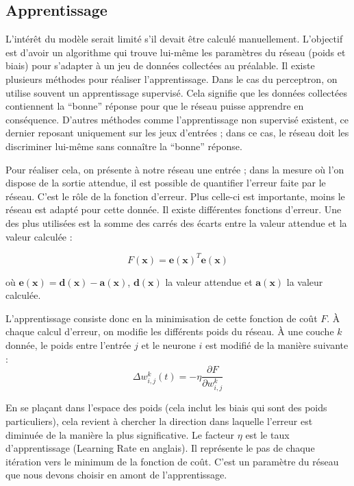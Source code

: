 \subsection{Apprentissage}

L'intérêt du modèle serait limité s'il devait être calculé manuellement. L'objectif est d'avoir un algorithme qui trouve lui-même les paramètres du réseau
(poids et biais) pour s'adapter à un jeu de données collectées au préalable. Il existe plusieurs méthodes pour réaliser l'apprentissage. Dans le cas du 
perceptron, on utilise souvent un apprentissage supervisé. Cela signifie que les données collectées contiennent la ``bonne'' réponse pour que 
le réseau puisse apprendre en conséquence. D'autres méthodes comme l'apprentissage non supervisé existent, ce dernier reposant uniquement sur les jeux 
d'entrées ; dans ce cas, le réseau doit les discriminer lui-même sans connaître la ``bonne'' réponse.

Pour réaliser cela, on présente à notre réseau une entrée ; dans la mesure où l'on dispose de la sortie attendue, il est possible de quantifier l'erreur
faite par le réseau.
C'est le rôle de la fonction d'erreur. Plus celle-ci est importante, moins le réseau est adapté pour cette donnée. Il existe différentes fonctions
d'erreur. Une des plus utilisées est la somme des carrés des écarts entre la valeur attendue et la valeur calculée : 

\begin{equation}
\displaystyle F\left(\mathbf{x}\right) = \mathbf{e\left(x\right)}^T\mathbf{e\left(x\right)} 
\end{equation}

où $\displaystyle \mathbf{e\left(x\right)} = \mathbf{d\left(x\right)} - \mathbf{a\left(x\right)} $,
$\mathbf{d\left(x\right)}$ la valeur attendue et $\mathbf{a\left(x\right)}$ la valeur calculée.


L'apprentissage consiste donc en la minimisation de cette fonction de coût $F$. À chaque calcul d'erreur, on modifie les différents poids du réseau.
À une couche $k$ donnée, le poids entre l'entrée $j$ et le neurone $i$ est modifié de la manière suivante : 
\begin{equation}
 \Delta w^k_{i,j}\left(t\right) = - \eta \frac{\partial F}{\partial w^k_{i,j}}
\end{equation}
 
En se plaçant dans l'espace des poids (cela inclut les biais qui sont des poids particuliers), cela revient à chercher la direction dans laquelle l'erreur
est diminuée de la manière la plus significative. Le facteur $\eta$ est le taux d'apprentissage (Learning Rate en anglais). Il représente le pas de
chaque itération vers le minimum de la fonction de coût. C'est un paramètre du réseau que nous devons choisir en amont de l'apprentissage.

